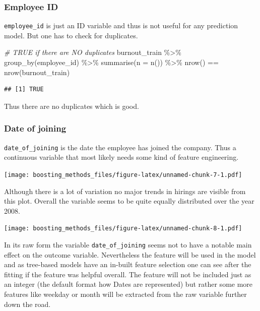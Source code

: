 \documentclass[
]{book}
\newenvironment{Shaded}{\begin{snugshade}}{\end{snugshade}}
\newcommand{\AttributeTok}[1]{\textcolor[rgb]{0.77,0.63,0.00}{#1}}
\newcommand{\CommentTok}[1]{\textcolor[rgb]{0.56,0.35,0.01}{\textit{#1}}}
\newcommand{\FunctionTok}[1]{\textcolor[rgb]{0.00,0.00,0.00}{#1}}
\newcommand{\NormalTok}[1]{#1}
\newcommand{\SpecialCharTok}[1]{\textcolor[rgb]{0.00,0.00,0.00}{#1}}
\begin{document}
\hypertarget{employee-id}{%
\subsubsection{Employee ID}\label{employee-id}}

\texttt{employee\_id} is just an ID variable and thus is not useful for any prediction model. But one has to check for duplicates.

\begin{Shaded}
\begin{Highlighting}[]
\CommentTok{\# TRUE if there are NO duplicates}
\NormalTok{burnout\_train }\SpecialCharTok{\%\textgreater{}\%}
  \FunctionTok{group\_by}\NormalTok{(employee\_id) }\SpecialCharTok{\%\textgreater{}\%}
  \FunctionTok{summarise}\NormalTok{(}\AttributeTok{n =} \FunctionTok{n}\NormalTok{()) }\SpecialCharTok{\%\textgreater{}\%}
  \FunctionTok{nrow}\NormalTok{() }\SpecialCharTok{==} \FunctionTok{nrow}\NormalTok{(burnout\_train)}
\end{Highlighting}
\end{Shaded}

\begin{verbatim}
## [1] TRUE
\end{verbatim}

Thus there are no duplicates which is good.

\hypertarget{date-of-joining}{%
\subsubsection{Date of joining}\label{date-of-joining}}

\texttt{date\_of\_joining} is the date the employee has joined the company. Thus a continuous variable that most likely needs some kind of feature engineering.

\texttt{[image: boosting\_methods\_files/figure-latex/unnamed-chunk-7-1.pdf]}

Although there is a lot of variation no major trends in hirings are visible from this plot. Overall the variable seems to be quite equally distributed over the year 2008.

\texttt{[image: boosting\_methods\_files/figure-latex/unnamed-chunk-8-1.pdf]}

In its raw form the variable \texttt{date\_of\_joining} seems not to have a notable main effect on the outcome variable. Nevertheless the feature will be used in the model and as tree-based models have an in-built feature selection one can see after the fitting if the feature was helpful overall. The feature will not be included just as an integer (the default format how Dates are represented) but rather some more features like weekday or month will be extracted from the raw variable further down the road.
\end{document}

